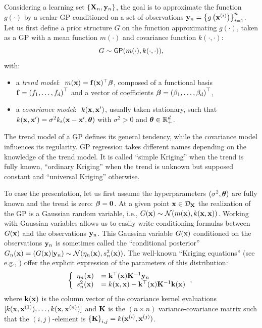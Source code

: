 Considering a learning set $\left\{{\bf X}_n, {\bf y}_n\right\}$, the goal is to approximate the function $g(\cdot)$ by a scalar GP conditioned on a set of observations ${\bf y}_n = \left\{g\left({\bf x}^{(i)}\right)\right\}_{i=1}^n$. 
Let us first define a prior structure $G$ on the function approximating $g(\cdot)$, taken as a GP with a mean function $m(\cdot)$ and covariance function $k(\cdot, \cdot)$:  
\begin{equation}
    G \sim \mathsf{GP}(m(\cdot), k(\cdot, \cdot)),
\end{equation} 
with: 
\begin{itemize}
    \item a \textit{trend model}: $~m({\bf x}) = \mathbf{f}({\bf x})^\top {\boldsymbol{\beta}}$, composed of a functional basis $\mathbf{f} = \left(f_1, \dots, f_d\right)^\top$ and a vector of coefficients 
    ${\boldsymbol{\beta}} = \left(\beta_1, \dots, \beta_d\right)^\top$,
    \item a \textit{covariance model}: $~k({\bf x}, {\bf x}')$, usually taken stationary, such that $k({\bf x}, {\bf x}') = \sigma^2 k_{\mathrm{s}}({\bf x} - {\bf x}', {\boldsymbol{\theta}})$ with $\sigma^2>0$ and ${\boldsymbol{\theta}} \in \mathbb{R}^d_+$.
\end{itemize}
The trend model of a GP defines its general tendency, while the covariance model influences its regularity. 
GP regression takes different names depending on the knowledge of the trend model. 
It is called ``simple Kriging'' when the trend is fully known, ``ordinary Kriging'' when the trend is unknown but supposed constant and ``universal Kriging'' otherwise. 

To ease the presentation, let us first assume the hyperparameters $(\sigma^2, {\boldsymbol{\theta}})$ are fully known and the trend is zero: ${\boldsymbol{\beta}} = \textbf{0}$. 
At a given point ${\bf x} \in \mathcal{D}_{\bf X}$ the realization of the GP is a Gaussian random variable, i.e.,  $G({\bf x}) \sim \mathcal{N}(m({\bf x}), k({\bf x}, {\bf x}))$. 
Working with Gaussian variables allows us to easily write conditioning formulas between $G({\bf x})$ and the observations ${\bf y}_n$. 
This Gaussian variable $G({\bf x})$ conditioned on the observations ${\bf y}_n$ is sometimes called the ``conditional posterior'' $G_n({\bf x}) = (G({\bf x}) | {\bf y}_n) \sim \mathcal{N}(\eta_n({\bf x}), s_n^2({\bf x}))$. 
The well-known ``Kriging equations'' (see e.g., \citealp{rasmussen_2006}) offer the explicit expression of the parameters of this distribution:
\begin{equation}
    \left\{
    \begin{array}{ll}
        \eta_n({\bf x}) &= {\bf k}^\top({\bf x}) {\bf K}^{-1} {\bf y}_n\\
        s_n^2({\bf x}) &= k({\bf x}, {\bf x}) - {\bf k}^\top({\bf x}) {\bf K}^{-1} {\bf k}({\bf x}) 
    \end{array}\, ,
\right.
\label{eq:kriging}
\end{equation}
where ${\bf k}({\bf x})$ is the column vector of the covariance kernel evaluations $[k({\bf x}, {\bf x}^{(1)}), \dots,\allowbreak k({\bf x}, {\bf x}^{(n)})]$ and ${\bf K}$ is the $(n \times n)$ 
variance-covariance matrix such that the $(i, j)$-element is $\left\{{\bf K} \right\}_{i, j}=k({\bf x}^{(i)}, {\bf x}^{(j)})$.

